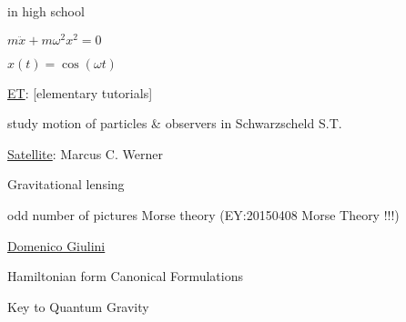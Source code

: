 in high school 

$m\ddot{x} + m\omega^2 x^2=0$

$x(t) = \cos{(\omega t)}$

\underline{ET}: [elementary tutorials]

study motion of particles \& observers in Schwarzscheld S.T.

\underline{Satellite}: Marcus C. Werner

Gravitational lensing

odd number of pictures Morse theory (EY:20150408 Morse Theory !!!)

\underline{Domenico Giulini}

Hamiltonian form
Canonical Formulations

Key to Quantum Gravity
